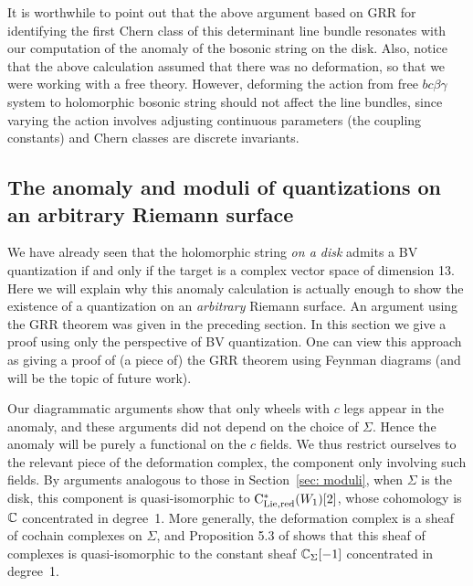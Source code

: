 It is worthwhile to point out that the above argument based on GRR for identifying the first Chern class of this determinant line bundle resonates with our computation of the anomaly of the bosonic string on the disk. 
Also, notice that the above calculation assumed that there was no deformation, so that we were working with a free theory. 
However, deforming the action from free $bc\beta\gamma$ system to holomorphic bosonic string should not affect the line bundles, 
since varying the action involves adjusting continuous parameters (the coupling constants) and Chern classes are discrete invariants.

\subsection{The anomaly and moduli of quantizations on an arbitrary Riemann surface}

We have already seen that the holomorphic string {\it on a disk} admits a BV quantization if and only if the target is a complex vector space of dimension 13.
Here we will explain why this anomaly calculation is actually enough to show the existence of a quantization on an {\it arbitrary} Riemann surface. 
An argument using the GRR theorem was given in the preceding section. 
In this section we give a proof using only the perspective of BV quantization.
One can view this approach as giving a proof of (a piece of) the GRR theorem using Feynman diagrams (and will be the topic of future work). 

Our diagrammatic arguments show that only wheels with $c$ legs appear in the anomaly,
and these arguments did not depend on the choice of $\Sigma$. 
Hence the anomaly will be purely a functional on the $c$ fields.
We thus restrict ourselves to the relevant piece of the deformation complex,
the component only involving such fields.
By arguments analogous to those in Section~\ref{sec: moduli}, 
when $\Sigma$ is the disk,
this component is quasi-isomorphic to ${\rm C}_{\rm Lie,red}^*(W_1)[2]$,
whose cohomology is $\mathbb C$ concentrated in degree~1.
More generally, the deformation complex is a sheaf of cochain complexes on $\Sigma$, 
and Proposition 5.3 of \cite{BWvir} shows that this sheaf of complexes is quasi-isomorphic to the constant sheaf $\mathbb C_\Sigma[-1]$ concentrated in degree~1. 

